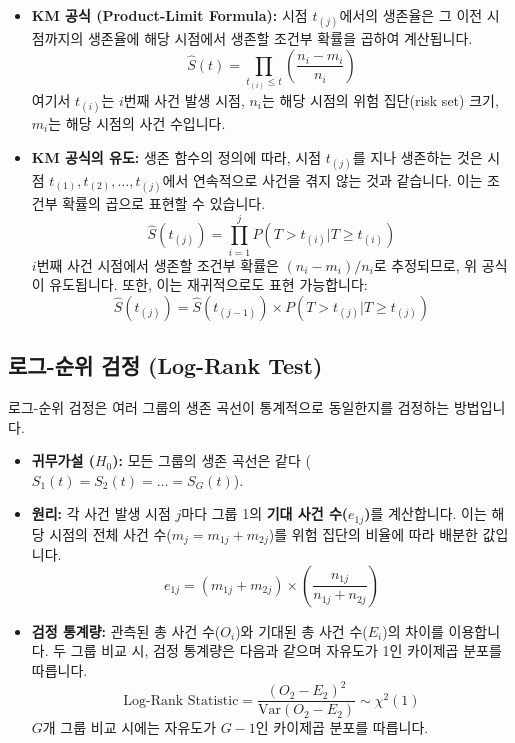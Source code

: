 \documentclass{article}
\begin{document}
\begin{itemize}
    \item \textbf{KM 공식 (Product-Limit Formula):}
    시점 $t_{(j)}$에서의 생존율은 그 이전 시점까지의 생존율에 해당 시점에서 생존할 조건부 확률을 곱하여 계산됩니다.
    $$\hat{S}(t) = \prod_{t_{(i)} \le t} \left( \frac{n_i - m_i}{n_i} \right)$$
    여기서 $t_{(i)}$는 $i$번째 사건 발생 시점, $n_i$는 해당 시점의 위험 집단(risk set) 크기, $m_i$는 해당 시점의 사건 수입니다.

    \item \textbf{KM 공식의 유도:}
    생존 함수의 정의에 따라, 시점 $t_{(j)}$를 지나 생존하는 것은 시점 $t_{(1)}, t_{(2)}, \dots, t_{(j)}$에서 연속적으로 사건을 겪지 않는 것과 같습니다. 이는 조건부 확률의 곱으로 표현할 수 있습니다.
    $$\hat{S}(t_{(j)}) = \prod_{i=1}^{j} P(T > t_{(i)} | T \ge t_{(i)})$$
    $i$번째 사건 시점에서 생존할 조건부 확률은 $(n_i - m_i)/n_i$로 추정되므로, 위 공식이 유도됩니다. 또한, 이는 재귀적으로도 표현 가능합니다:
    $$\hat{S}(t_{(j)}) = \hat{S}(t_{(j-1)}) \times P(T > t_{(j)} | T \ge t_{(j)})$$
\end{itemize}

\subsection{로그-순위 검정 (Log-Rank Test)}
로그-순위 검정은 여러 그룹의 생존 곡선이 통계적으로 동일한지를 검정하는 방법입니다.

\begin{itemize}
    \item \textbf{귀무가설 ($H_0$):} 모든 그룹의 생존 곡선은 같다 ($S_1(t) = S_2(t) = \dots = S_G(t)$).
    \item \textbf{원리:} 각 사건 발생 시점 $j$마다 그룹 1의 \textbf{기대 사건 수($e_{1j}$)}를 계산합니다. 이는 해당 시점의 전체 사건 수($m_j = m_{1j} + m_{2j}$)를 위험 집단의 비율에 따라 배분한 값입니다.
    $$e_{1j} = (m_{1j} + m_{2j}) \times \left( \frac{n_{1j}}{n_{1j} + n_{2j}} \right)$$
    \item \textbf{검정 통계량:} 관측된 총 사건 수($O_i$)와 기대된 총 사건 수($E_i$)의 차이를 이용합니다. 두 그룹 비교 시, 검정 통계량은 다음과 같으며 자유도가 1인 카이제곱 분포를 따릅니다.
    $$\text{Log-Rank Statistic} = \frac{(O_2 - E_2)^2}{\text{Var}(O_2 - E_2)} \sim \chi^2(1)$$
    $G$개 그룹 비교 시에는 자유도가 $G-1$인 카이제곱 분포를 따릅니다.
\end{itemize}

\end{document}
